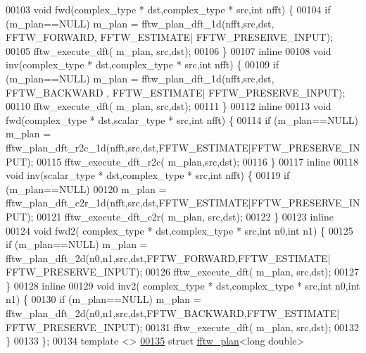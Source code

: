 \begin{DoxyCode}
00103       \textcolor{keywordtype}{void} fwd(complex\_type * dst,complex\_type * src,\textcolor{keywordtype}{int} nfft) \{
00104           \textcolor{keywordflow}{if} (m\_plan==NULL) m\_plan = fftw\_plan\_dft\_1d(nfft,src,dst, FFTW\_FORWARD, FFTW\_ESTIMATE|
      FFTW\_PRESERVE\_INPUT);
00105           fftw\_execute\_dft( m\_plan, src,dst);
00106       \}
00107       \textcolor{keyword}{inline}
00108       \textcolor{keywordtype}{void} inv(complex\_type * dst,complex\_type * src,\textcolor{keywordtype}{int} nfft) \{
00109           \textcolor{keywordflow}{if} (m\_plan==NULL) m\_plan = fftw\_plan\_dft\_1d(nfft,src,dst, FFTW\_BACKWARD , FFTW\_ESTIMATE|
      FFTW\_PRESERVE\_INPUT);
00110           fftw\_execute\_dft( m\_plan, src,dst);
00111       \}
00112       \textcolor{keyword}{inline}
00113       \textcolor{keywordtype}{void} fwd(complex\_type * dst,scalar\_type * src,\textcolor{keywordtype}{int} nfft) \{
00114           \textcolor{keywordflow}{if} (m\_plan==NULL) m\_plan = fftw\_plan\_dft\_r2c\_1d(nfft,src,dst,FFTW\_ESTIMATE|FFTW\_PRESERVE\_INPUT);
00115           fftw\_execute\_dft\_r2c( m\_plan,src,dst);
00116       \}
00117       \textcolor{keyword}{inline}
00118       \textcolor{keywordtype}{void} inv(scalar\_type * dst,complex\_type * src,\textcolor{keywordtype}{int} nfft) \{
00119           \textcolor{keywordflow}{if} (m\_plan==NULL)
00120               m\_plan = fftw\_plan\_dft\_c2r\_1d(nfft,src,dst,FFTW\_ESTIMATE|FFTW\_PRESERVE\_INPUT);
00121           fftw\_execute\_dft\_c2r( m\_plan, src,dst);
00122       \}
00123       \textcolor{keyword}{inline} 
00124       \textcolor{keywordtype}{void} fwd2( complex\_type * dst,complex\_type * src,\textcolor{keywordtype}{int} n0,\textcolor{keywordtype}{int} n1) \{
00125           \textcolor{keywordflow}{if} (m\_plan==NULL) m\_plan = fftw\_plan\_dft\_2d(n0,n1,src,dst,FFTW\_FORWARD,FFTW\_ESTIMATE|
      FFTW\_PRESERVE\_INPUT);
00126           fftw\_execute\_dft( m\_plan, src,dst);
00127       \}
00128       \textcolor{keyword}{inline} 
00129       \textcolor{keywordtype}{void} inv2( complex\_type * dst,complex\_type * src,\textcolor{keywordtype}{int} n0,\textcolor{keywordtype}{int} n1) \{
00130           \textcolor{keywordflow}{if} (m\_plan==NULL) m\_plan = fftw\_plan\_dft\_2d(n0,n1,src,dst,FFTW\_BACKWARD,FFTW\_ESTIMATE|
      FFTW\_PRESERVE\_INPUT);
00131           fftw\_execute\_dft( m\_plan, src,dst);
00132       \}
00133   \};
00134   \textcolor{keyword}{template} <> 
\hyperlink{struct_eigen_1_1internal_1_1fftw__plan_3_01long_01double_01_4}{00135}   \textcolor{keyword}{struct }\hyperlink{struct_eigen_1_1internal_1_1fftw__plan}{fftw\_plan}<long double>

\end{DoxyCode}
